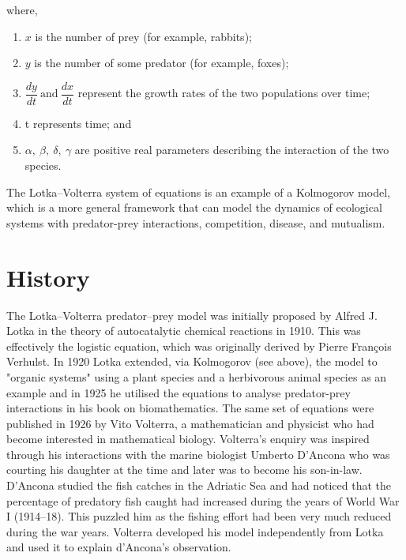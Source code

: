 \documentclass{article}
\begin{document}
where,

\begin{enumerate}
\item $x$ is the number of prey (for example, rabbits);
\item $y$ is the number of some predator (for example, foxes);
\item $ \dfrac{dy}{dt} ~ \text{and} ~\dfrac{dx}{dt}$ represent the growth rates of the two populations over time;
\item t represents time; and
\item $\alpha , ~\beta , ~\delta , ~\gamma$ are positive real parameters describing the interaction of the two species.

\end{enumerate}

The Lotka–Volterra system of equations is an example of a Kolmogorov model,\cite{ref1}\cite{ref2}\cite{ref3} which is a more general framework that can model the dynamics of ecological systems with predator-prey interactions, competition, disease, and mutualism.

\section{History}

The Lotka–Volterra predator–prey model was initially proposed by Alfred J. Lotka in the theory of autocatalytic chemical reactions in 1910.\cite{ref4}\cite{ref5} This was effectively the logistic equation,\cite{ref6} which was originally derived by Pierre François Verhulst.\cite{ref7} In 1920 Lotka extended, via Kolmogorov (see above), the model to "organic systems" using a plant species and a herbivorous animal species as an example and in 1925 he utilised the equations to analyse predator-prey interactions in his book on biomathematics. The same set of equations were published in 1926 by Vito Volterra, a mathematician and physicist who had become interested in mathematical biology.\cite{ref5} Volterra's enquiry was inspired through his interactions with the marine biologist Umberto D'Ancona who was courting his daughter at the time and later was to become his son-in-law. D'Ancona studied the fish catches in the Adriatic Sea and had noticed that the percentage of predatory fish caught had increased during the years of World War I (1914–18). This puzzled him as the fishing effort had been very much reduced during the war years. Volterra developed his model independently from Lotka and used it to explain d'Ancona's observation.
\end{document}
